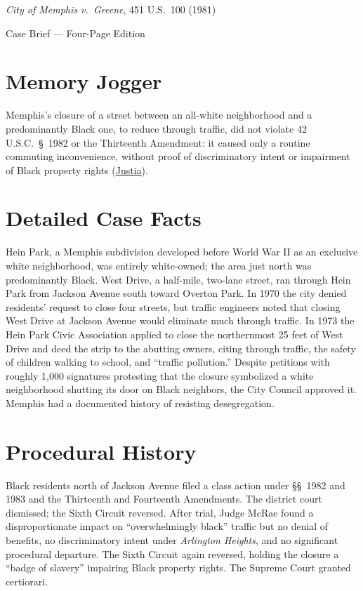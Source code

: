 \documentclass[12pt]{article}
\begin{document}
\begin{center}
{\LARGE \textit{City of Memphis v.\ Greene}, 451 U.S.\ 100 (1981)\par}
\vspace{0.8em}
{\large Case Brief --- Four-Page Edition\par}
\end{center}
\vspace{1em}

\section{Memory Jogger}

Memphis's closure of a street between an all-white neighborhood and a predominantly Black one, to reduce through traffic, did not violate 42 U.S.C.\ \S~1982 or the Thirteenth Amendment: it caused only a routine commuting inconvenience, without proof of discriminatory intent or impairment of Black property rights (\href{https://supreme.justia.com/cases/federal/us/451/100/}{Justia}).

\section{Detailed Case Facts}

Hein Park, a Memphis subdivision developed before World War II as an exclusive white neighborhood, was entirely white-owned; the area just north was predominantly Black. West Drive, a half-mile, two-lane street, ran through Hein Park from Jackson Avenue south toward Overton Park. In 1970 the city denied residents' request to close four streets, but traffic engineers noted that closing West Drive at Jackson Avenue would eliminate much through traffic. In 1973 the Hein Park Civic Association applied to close the northernmost 25 feet of West Drive and deed the strip to the abutting owners, citing through traffic, the safety of children walking to school, and ``traffic pollution.'' Despite petitions with roughly 1,000 signatures protesting that the closure symbolized a white neighborhood shutting its door on Black neighbors, the City Council approved it. Memphis had a documented history of resisting desegregation.

\section{Procedural History}

Black residents north of Jackson Avenue filed a class action under \S\S~1982 and 1983 and the Thirteenth and Fourteenth Amendments. The district court dismissed; the Sixth Circuit reversed. After trial, Judge McRae found a disproportionate impact on ``overwhelmingly black'' traffic but no denial of benefits, no discriminatory intent under \textit{Arlington Heights}, and no significant procedural departure. The Sixth Circuit again reversed, holding the closure a ``badge of slavery'' impairing Black property rights. The Supreme Court granted certiorari.
\end{document}
